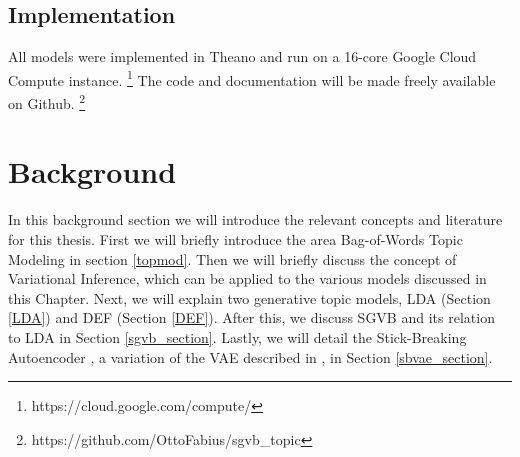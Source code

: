 \documentclass{report}
\begin{document}
\section{Implementation}
All models were implemented in Theano and run on a 16-core Google Cloud Compute instance. \footnote{https://cloud.google.com/compute/} The code and documentation will be made freely available on Github. \footnote{https://github.com/OttoFabius/sgvb_topic}

 
\pagebreak 
\nocite{*}


\chapter{Background}\label{Background}
In this background section we will introduce the relevant concepts and literature for this thesis. First we will briefly introduce the area Bag-of-Words Topic Modeling in section \ref{topmod}. Then we will briefly discuss the concept of Variational Inference, which can be applied to the various models discussed in this Chapter. Next, we will explain two generative topic models, LDA (Section \ref{LDA}) and DEF (Section \ref{DEF}). After this, we discuss SGVB \cite{kingma2013auto} \cite{rezende2014stochastic} and its relation to LDA in Section \ref{sgvb_section}. Lastly, we will detail the Stick-Breaking Autoencoder \cite{nalisnick2016deep}, a variation of the VAE described in \cite{kingma2013auto}, in Section \ref{sbvae_section}.\\
\end{document}
